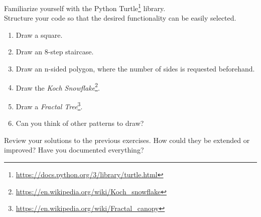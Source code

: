 \documentclass{ubo_tex_uebungszettel/uebungszettel}
\theoremstyle{definition}
\newcommand{\furl}[1]{\footnote{\url{#1}}}
\begin{document}
\medskip
\noindent {} \quad


    \noindent Familiarize yourself with the Python Turtle\furl{https://docs.python.org/3/library/turtle.html} library.\\
    Structure your code so that the desired functionality can be easily selected.
    \begin{enumerate}
        \item Draw a square.
        \item Draw an 8-step staircase.
        \item Draw an n-sided polygon, where the number of sides is requested beforehand.
        \item Draw the \textsl{Koch Snowflake}\furl{https://en.wikipedia.org/wiki/Koch_snowflake}.
        \item Draw a \textsl{Fractal Tree}\furl{https://en.wikipedia.org/wiki/Fractal_canopy}.
        \item Can you think of other patterns to draw?
        \noindent 
    \end{enumerate}

    \medskip
\noindent {} \quad
\noindent
    Review your solutions to the previous exercises. How could they be extended or improved? Have you documented everything?
\end{document}
